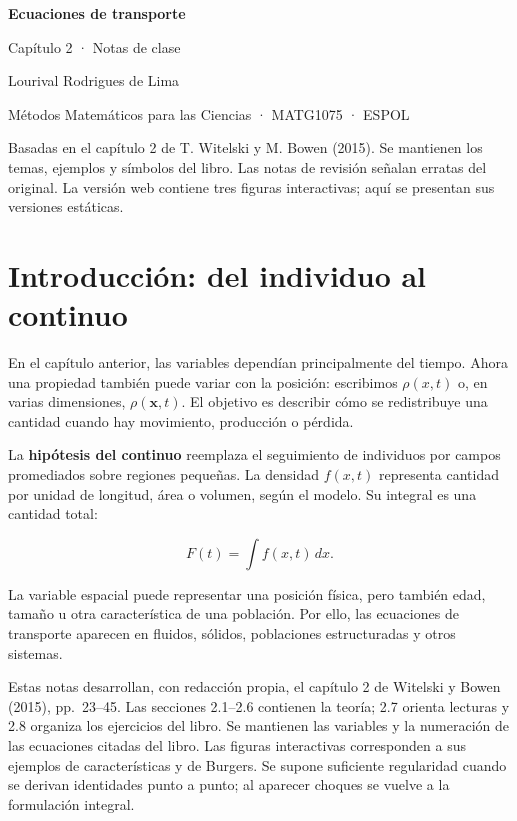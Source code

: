 \documentclass[11pt,a4paper]{article}
\begin{document}
\begin{center}
{\color{deepgreen}\Huge\bfseries Ecuaciones de transporte}\par\vspace{6mm}
{\Large Capítulo 2 · Notas de clase}\par\vspace{5mm}
Lourival Rodrigues de Lima\par
Métodos Matemáticos para las Ciencias · MATG1075 · ESPOL
\end{center}
\vspace{5mm}
Basadas en el capítulo 2 de T. Witelski y M. Bowen (2015). Se mantienen los temas, ejemplos y símbolos del libro. Las notas de revisión señalan erratas del original. La versión web contiene tres figuras interactivas; aquí se presentan sus versiones estáticas.
\tableofcontents\newpage
\hypertarget{introducciuxf3n-del-individuo-al-continuo}{%
\section{Introducción: del individuo al
continuo}\label{introducciuxf3n-del-individuo-al-continuo}}

En el capítulo anterior, las variables dependían principalmente del
tiempo. Ahora una propiedad también puede variar con la posición:
escribimos \(\rho(x,t)\) o, en varias dimensiones,
\(\rho(\mathbf x,t)\). El objetivo es describir cómo se redistribuye una
cantidad cuando hay movimiento, producción o pérdida.

La \textbf{hipótesis del continuo} reemplaza el seguimiento de
individuos por campos promediados sobre regiones pequeñas. La densidad
\(f(x,t)\) representa cantidad por unidad de longitud, área o volumen,
según el modelo. Su integral es una cantidad total:

\[F(t)=\int f(x,t)\,dx.\]

La variable espacial puede representar una posición física, pero también
edad, tamaño u otra característica de una población. Por ello, las
ecuaciones de transporte aparecen en fluidos, sólidos, poblaciones
estructuradas y otros sistemas.

Estas notas desarrollan, con redacción propia, el capítulo 2 de Witelski
y Bowen (2015), pp.~23--45. Las secciones 2.1--2.6 contienen la teoría;
2.7 orienta lecturas y 2.8 organiza los ejercicios del libro. Se
mantienen las variables y la numeración de las ecuaciones citadas del
libro. Las figuras interactivas corresponden a sus ejemplos de
características y de Burgers. Se supone suficiente regularidad cuando se
derivan identidades punto a punto; al aparecer choques se vuelve a la
formulación integral.
\end{document}
